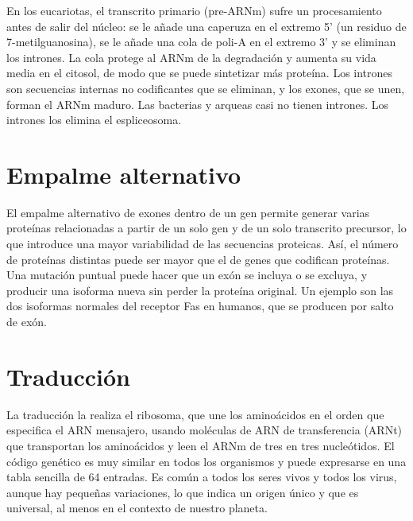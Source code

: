 \documentclass{book}
\begin{document}
En los eucariotas, el transcrito primario (pre-ARNm) sufre un procesamiento antes de salir del núcleo: se le añade una caperuza en el extremo 5' (un residuo de 7-metilguanosina), se le añade una cola de poli-A en el extremo 3' y se eliminan los intrones. La cola protege al ARNm de la degradación y aumenta su vida media en el citosol, de modo que se puede sintetizar más proteína. Los intrones son secuencias internas no codificantes que se eliminan, y los exones, que se unen, forman el ARNm maduro. Las bacterias y arqueas casi no tienen intrones. Los intrones los elimina el espliceosoma.


\section{Empalme alternativo}

El empalme alternativo de exones dentro de un gen permite generar varias proteínas relacionadas a partir de un solo gen y de un solo transcrito precursor, lo que introduce una mayor variabilidad de las secuencias proteicas. Así, el número de proteínas distintas puede ser mayor que el de genes que codifican proteínas. Una mutación puntual puede hacer que un exón se incluya o se excluya, y producir una isoforma nueva sin perder la proteína original. Un ejemplo son las dos isoformas normales del receptor Fas en humanos, que se producen por salto de exón.


\section{Traducción}

La traducción la realiza el ribosoma, que une los aminoácidos en el orden que especifica el ARN mensajero, usando moléculas de ARN de transferencia (ARNt) que transportan los aminoácidos y leen el ARNm de tres en tres nucleótidos. El código genético es muy similar en todos los organismos y puede expresarse en una tabla sencilla de 64 entradas. Es común a todos los seres vivos y todos los virus, aunque hay pequeñas variaciones, lo que indica un origen único y que es universal, al menos en el contexto de nuestro planeta.
\end{document}
